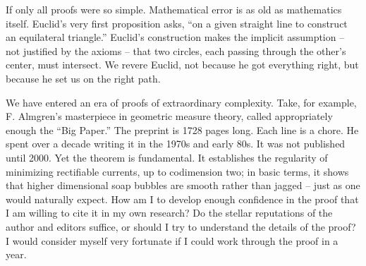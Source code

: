 \documentclass{llncs}
\begin{document}
If only all proofs were so simple.  
Mathematical error is as old as mathematics itself.
Euclid's very first proposition asks, ``on a given straight line
to construct an equilateral triangle.''  Euclid's construction
makes the implicit assumption -- not justified by the axioms -- that
two circles, each passing through the other's center, must intersect.
We revere Euclid, not because he got everything right, but because
he set us on the right path.

We have entered an era of proofs of extraordinary complexity.
Take, for example, F. Almgren's masterpiece in geometric measure
theory, called appropriately enough the ``Big Paper.'' 
The preprint is
1728 pages long. Each line is a chore. He spent over a decade writing it in the 1970s and
early 80s.  It was not published until 2000.  Yet the theorem
is fundamental.  It establishes the regularity of minimizing
rectifiable currents, up to codimension two;  in basic terms, 
it shows that higher dimensional soap bubbles are smooth
rather than jagged -- just
as one would naturally expect.  How am I to develop enough confidence
in the proof that I am willing to cite it in my own research?
Do the stellar reputations of the author
and editors suffice, or should I try to understand the details of the
proof?  I
would consider myself very fortunate if I could work through the proof
in a year.
\end{document}
